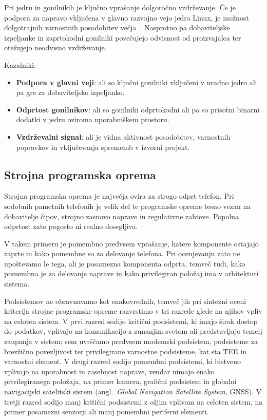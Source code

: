 \documentclass[a4paper,12pt,openright]{book}
\begin{document}
Pri jedru in gonilnikih je ključno vprašanje dolgoročno vzdrževanje.
Če je podpora za napravo vključena v glavno razvojno vejo jedra Linux, je možnost dolgotrajnih varnostnih posodobitev večja~\cite{kernelorg_releases}.
Nasprotno pa dobaviteljske izpeljanke in zaprtokodni gonilniki povečujejo odvisnost od proizvajalca ter otežujejo neodvisno vzdrževanje.

Kazalniki:
\begin{itemize}
  \item \textbf{Podpora v glavni veji}: ali so ključni gonilniki vključeni v uradno jedro ali pa gre za dobaviteljsko izpeljanko.
  \item \textbf{Odprtost gonilnikov}: ali so gonilniki odprtokodni ali pa so prisotni binarni dodatki v jedru oziroma uporabniškem prostoru.
  \item \textbf{Vzdrževalni signal}: ali je vidna aktivnost posodobitev, varnostnih popravkov in vključevanja sprememb v izvorni projekt.
\end{itemize}

\subsection{Strojna programska oprema}
\label{subsec:model_firmware}

Strojna programska oprema je največja ovira za strogo odprt telefon.
Pri sodobnih pametnih telefonih je velik del te programske opreme tesno vezan na dobavitelje čipov, strojno zasnovo naprave in regulativne zahteve.
Popolna odprtost zato pogosto ni realno dosegljiva.

V takem primeru je pomembno predvsem vprašanje, katere komponente ostajajo zaprte in kako pomembne so za delovanje telefona. Pri ocenjevanju zato ne upoštevamo le tega, ali je posamezna komponenta odprta, temveč tudi, kako pomembna je za delovanje naprave in kako privilegiran položaj ima v arhitekturi sistema.

Podsistemov ne obravnavamo kot enakovrednih, temveč jih pri sintezni oceni kriterija strojne programske opreme razvrstimo v tri razrede glede na njihov vpliv na celoten sistem.
V prvi razred sodijo kritični podsistemi, ki imajo širok dostop do podatkov, vplivajo na komunikacijo z zunanjim svetom ali predstavljajo temelj zaupanja v sistem; sem uvrščamo predvsem modemski podsistem, podsisteme za brezžično povezljivost ter privilegirane varnostne podsisteme, kot sta TEE in varnostni element.
V drugi razred sodijo pomembni podsistemi, ki bistveno vplivajo na uporabnost in zasebnost naprave, vendar nimajo enako privilegiranega položaja, na primer kamera, grafični podsistem in globalni navigacijski satelitski sistem (angl.~\textit{Global Navigation Satellite System}, GNSS).
V tretji razred sodijo manj kritični podsistemi z ožjim vplivom na celoten sistem, na primer posamezni senzorji ali manj pomembni periferni elementi.
\end{document}
